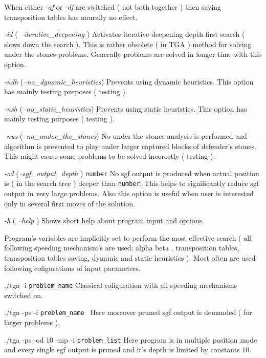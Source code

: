 \begin{description}
	When either {\it -af} or {\it -df} are switched ( not both together ) then saving transposition tables has naurally no effect.
	\item {\it -id} ( {\it --iterative\_deepening } ) Activates iterative deepening depth first search ( slows down the search ). This is rather
	obsolete ( in TGA ) method for solving under the stones problems. Generally problems are solved in longer time with this option.
	\item {\it -ndh} ({\it --no\_dynamic\_heuristics})  Prevents using dynamic heuristics. This option has mainly testing purposes ( testing ).
	\item {\it -nsh} ({\it --no\_static\_heuristics})  Prevents using static heuristics. This option has mainly testing purposes ( testing ).
	\item {\it -nus} ({\it --no\_under\_the\_stones}) No under the stones analysis is performed and algorithm is prevented to play under larger captured
		blocks of defender's stones. This might cause some problems to be solved incorectly ( testing ). 
	\item {\it -od} ({\it --sgf\_output\_depth } ) {\tt number} No sgf output is produced when actual position is ( in the search tree ) deeper than
		{\tt number}. This helps to significantly reduce sgf output in very large problems. Also this option is useful when user is interested only in several
		first moves of the solution.
	\item {\it -h} ( {\it --help } ) Shows short help about program input and options.
\end{description}
		
Program's variables are implicitly set to perform the most effective search ( all following speeding mechanism's are used: alpha beta , transposition
tables, transposition tables saving, dynamic and static heuristics ). Most often are used following cofigurations of input parameters.
\begin{description}
	\item ./tga -i {\tt problem\_name} Classical cofiguration with all speeding mechanisms switched on.
	\item ./tga -ps -i {\tt problem\_name } Here moreover pruned sgf output is demanded ( for larger problems ). 
	\item ./tga -ps -od 10 -mp -i {\tt problem\_list} Here program is in multiple position mode and every single sgf output is pruned and it's depth is
		limited by constants 10.
\end{description}

